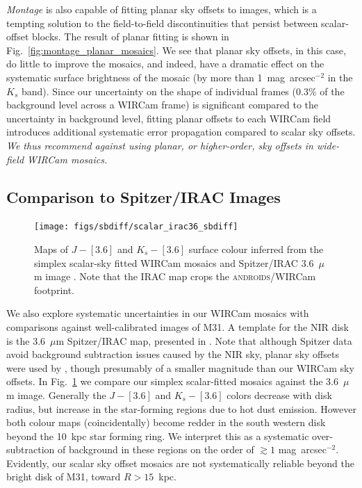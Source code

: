 \documentclass[iop]{emulateapj}
\newcommand{\sw}[1]{\textit{#1}} %
\newcommand{\androids}{\textsc{androids}}
\newcommand{\Fig}[1]{Fig.~\ref{fig:#1}}  %
\begin{document}
\sw{Montage} is also capable of fitting planar sky offsets to images, which is a tempting solution to the field-to-field discontinuities that persist between scalar-offset blocks.
The result of planar fitting is shown in \Fig{montage_planar_mosaics}.
We see that planar sky offsets, in this case, do little to improve the mosaics, and indeed, have a dramatic effect on the systematic surface brightness of the mosaic (by more than 1~mag~arcsec$^{-2}$ in the $K_s$ band).
Since our uncertainty on the shape of individual frames (0.3\% of the background level across a WIRCam frame) is significant compared to the uncertainty in background level, fitting planar offsets to each WIRCam field introduces additional systematic error propagation compared to scalar sky offsets.
\textit{We thus recommend against using planar, or higher-order, sky offsets in wide-field WIRCam mosaics.}

\subsection{Comparison to Spitzer/IRAC Images}

\begin{figure}[t]
\centering
\texttt{[image: figs/sbdiff/scalar\_irac36\_sbdiff]}
\caption{Maps of $J-[3.6]$ and $K_s-[3.6]$ surface colour inferred from the simplex scalar-sky fitted WIRCam mosaics and Spitzer/IRAC 3.6~$\mu$m image \citep{Barmby:2006}.
Note that the IRAC map crops the \androids/WIRCam footprint.}
\label{fig:scalar_irac36_sbdiff}
\end{figure}

We also explore systematic uncertainties in our WIRCam mosaics with comparisons against well-calibrated images of M31.
A template for the NIR disk is the 3.6~$\mu$m Spitzer/IRAC map, presented in \cite{Barmby:2006}.
Note that although Spitzer data avoid background subtraction issues caused by the NIR sky, planar sky offsets were used by \citeauthor{Barmby:2006}, though presumably of a smaller magnitude than our WIRCam sky offsets.
In \Fig{scalar_irac36_sbdiff} we compare our simplex scalar-fitted mosaics against the 3.6~$\mu$m image.
Generally the $J-[3.6]$ and $K_s-[3.6]$ colors decrease with disk radius, but increase in the star-forming regions due to hot dust emission.
However both colour maps (coincidentally) become redder in the south western disk beyond the 10~kpc star forming ring.
We interpret this as a systematic over-subtraction of background in these regions on the order of $\gtrsim 1$ mag~arcsec$^{-2}$.
Evidently, our scalar sky offset mosaics are not systematically reliable beyond the bright disk of M31, toward $R>15$~kpc.
\end{document}
